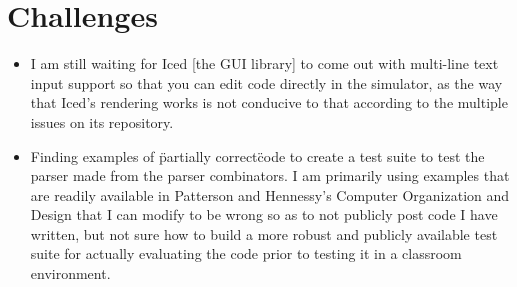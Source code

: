 \documentclass{article}
\begin{document}
\section{Challenges}
\begin{itemize}
    \item I am still waiting for Iced [the GUI library] to come out with multi-line text input support so that you can edit code directly in the simulator, as the way that Iced's rendering works is not conducive to that according to the multiple issues on its repository.
    \item Finding examples of \"partially correct\" code to create a test suite to test the parser made from the parser combinators. I am primarily using examples that are readily available in Patterson and Hennessy's Computer Organization and Design that I can modify to be wrong so as to not publicly post code I have written, but not sure how to build a more robust and publicly available test suite for actually evaluating the code prior to testing it in a classroom environment.
\end{itemize}
\end{document}

